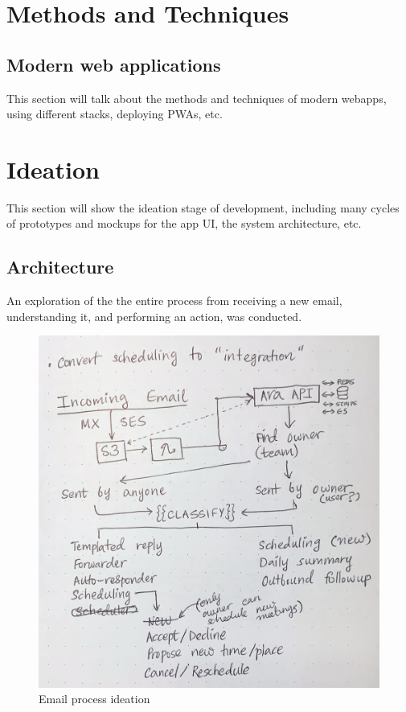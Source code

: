 \documentclass{article}
\begin{document}
\newpage

\section{Methods and Techniques}

\subsection{Modern web applications}

This section will talk about the methods and techniques of modern webapps, using different stacks, deploying PWAs, etc.

\newpage

\section{Ideation}

This section will show the ideation stage of development, including many cycles of prototypes and mockups for the app UI, the system architecture, etc.

\subsection{Architecture}

An exploration of the the entire process from receiving a new email, understanding it, and performing an action, was conducted.

\begin{figure}\centering
	\includegraphics[scale=0.1]{drawing-all-process.jpg}
	\caption{Email process ideation}
\end{figure}
\end{document}
